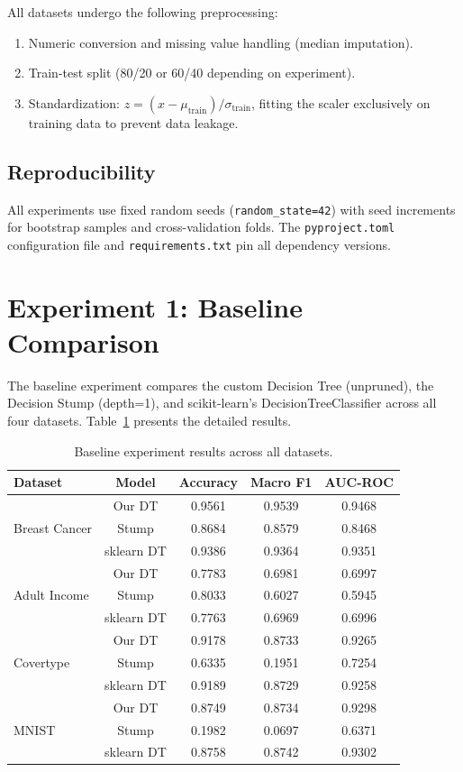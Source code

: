\documentclass[conference,12pt]{IEEEtran}
\begin{document}
All datasets undergo the following preprocessing:
\begin{enumerate}
    \item Numeric conversion and missing value handling (median imputation).
    \item Train-test split (80/20 or 60/40 depending on experiment).
    \item Standardization: $z = (x - \mu_{\text{train}}) / \sigma_{\text{train}}$, fitting the scaler exclusively on training data to prevent data leakage.
\end{enumerate}

\subsection{Reproducibility}

All experiments use fixed random seeds (\texttt{random\_state=42}) with seed increments for bootstrap samples and cross-validation folds. The \texttt{pyproject.toml} configuration file and \texttt{requirements.txt} pin all dependency versions.

\section{Experiment 1: Baseline Comparison}

The baseline experiment compares the custom Decision Tree (unpruned), the Decision Stump (depth=1), and scikit-learn's DecisionTreeClassifier across all four datasets. Table~\ref{tab:baseline_results} presents the detailed results.

\begin{table}[h]
\centering
\caption{Baseline experiment results across all datasets.}
\label{tab:baseline_results}
\small
\begin{tabular}{lcccc}
\toprule
Dataset & Model & Accuracy & Macro F1 & AUC-ROC \\
\midrule
\multirow{3}{*}{Breast Cancer}
 & Our DT & 0.9561 & 0.9539 & 0.9468 \\
 & Stump & 0.8684 & 0.8579 & 0.8468 \\
 & sklearn DT & 0.9386 & 0.9364 & 0.9351 \\
\midrule
\multirow{3}{*}{Adult Income}
 & Our DT & 0.7783 & 0.6981 & 0.6997 \\
 & Stump & 0.8033 & 0.6027 & 0.5945 \\
 & sklearn DT & 0.7763 & 0.6969 & 0.6996 \\
\midrule
\multirow{3}{*}{Covertype}
 & Our DT & 0.9178 & 0.8733 & 0.9265 \\
 & Stump & 0.6335 & 0.1951 & 0.7254 \\
 & sklearn DT & 0.9189 & 0.8729 & 0.9258 \\
\midrule
\multirow{3}{*}{MNIST}
 & Our DT & 0.8749 & 0.8734 & 0.9298 \\
 & Stump & 0.1982 & 0.0697 & 0.6371 \\
 & sklearn DT & 0.8758 & 0.8742 & 0.9302 \\
\bottomrule
\end{tabular}
\end{table}
\end{document}
